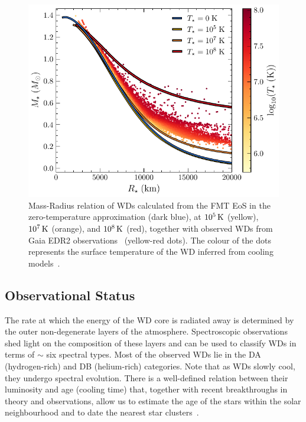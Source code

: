 \begin{figure}[t!bp]
    \centering
    \includegraphics{WD_mass_radius.pdf}
    \caption[Mass-Radius relation of WDs calculated from the FMT EoS in the zero-temperature approximation (dark blue), at $10^{5}\K$ (yellow), $10^{7}\K$ (orange), and $10^{8}\K$ (red), together with observed WDs from Gaia EDR2 observations~\cite{GentileFusillo_feb_GaiaDataRelease} (yellow-red dots).]{Mass-Radius relation of WDs calculated from the FMT EoS in the zero-temperature approximation (dark blue), at $10^{5}\K$ (yellow), $10^{7}\K$ (orange), and $10^{8}\K$ (red), together with observed WDs from Gaia EDR2 observations~\cite{GentileFusillo_feb_GaiaDataRelease} (yellow-red dots). The colour of the dots represents the surface temperature of the WD inferred from cooling models~\cite{Bedard_oct_Spectralevolutionhot}.}
    \label{ch2:fig:WD_mass_radius}
\end{figure}


\subsection{Observational Status}
\label{ch2:subsec:WD_obs}

The rate at which the energy of the WD core is radiated away is determined by the outer non-degenerate layers of the atmosphere. 
Spectroscopic observations shed light on the composition of these layers and can be used to classify WDs in terms of $\sim$ six spectral types. 
Most of the observed WDs lie in the DA (hydrogen-rich) and DB (helium-rich) categories.  Note that as WDs slowly cool, they undergo spectral evolution. There is a well-defined relation between their luminosity and age (cooling time) that, together with recent breakthroughs in theory and observations, allow us to estimate the age of the stars within the solar neighbourhood and to date the nearest star clusters~\cite{Hansen:2004ih_HSTobservationswhite,Hansen:2007ve_Whitedwarfcooling,Bedin:2009it_jun_Endwhitedwarf,Hansen:2013gda_aug_Agedifferencetwo,Kilic_mar_Agesthindisk}. 

